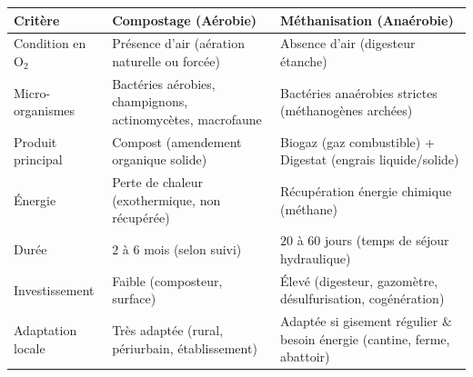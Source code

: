 \documentclass[11pt]{article}
\begin{document}
\begin{propriete}
\begin{center}
\begin{tabularx}{\linewidth}{|l|X|X|}
\hline
\rowcolor{popblueL} \textbf{Critère} & \textbf{Compostage (Aérobie)} & \textbf{Méthanisation (Anaérobie)} \\
\hline
Condition en O$_2$ & Présence d'air (aération naturelle ou forcée) & Absence d'air (digesteur étanche) \\
\hline
Micro-organismes & Bactéries aérobies, champignons, actinomycètes, macrofaune & Bactéries anaérobies strictes (méthanogènes archées) \\
\hline
Produit principal & Compost (amendement organique solide) & Biogaz (gaz combustible) + Digestat (engrais liquide/solide) \\
\hline
Énergie & Perte de chaleur (exothermique, non récupérée) & Récupération énergie chimique (méthane) \\
\hline
Durée & $2$ à $6$ mois (selon suivi) & $20$ à $60$ jours (temps de séjour hydraulique) \\
\hline
Investissement & Faible (composteur, surface) & Élevé (digesteur, gazomètre, désulfurisation, cogénération) \\
\hline
Adaptation locale & Très adaptée (rural, périurbain, établissement) & Adaptée si gisement régulier $\&$ besoin énergie (cantine, ferme, abattoir) \\
\hline
\end{tabularx}
\end{center}
\end{propriete}
\end{document}

